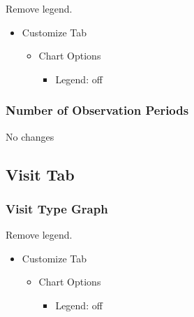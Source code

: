 \documentclass[
]{book}
\providecommand{\tightlist}{%
  \setlength{\itemsep}{0pt}\setlength{\parskip}{0pt}}
\begin{document}
Remove legend.

\begin{itemize}
\tightlist
\item
  Customize Tab

  \begin{itemize}
  \tightlist
  \item
    Chart Options

    \begin{itemize}
    \tightlist
    \item
      Legend: off
    \end{itemize}
  \end{itemize}
\end{itemize}

\hypertarget{number-of-observation-periods-1}{%
\subsubsection*{Number of Observation Periods}\label{number-of-observation-periods-1}}

No changes

\hypertarget{visit-tab-1}{%
\subsection*{Visit Tab}\label{visit-tab-1}}

\hypertarget{visit-type-graph-1}{%
\subsubsection*{Visit Type Graph}\label{visit-type-graph-1}}

Remove legend.

\begin{itemize}
\tightlist
\item
  Customize Tab

  \begin{itemize}
  \tightlist
  \item
    Chart Options

    \begin{itemize}
    \tightlist
    \item
      Legend: off
    \end{itemize}
  \end{itemize}
\end{itemize}
\end{document}
